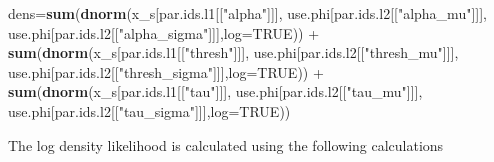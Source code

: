\documentclass[]{article}
\newenvironment{Shaded}{\begin{snugshade}}{\end{snugshade}}
\newcommand{\KeywordTok}[1]{\textcolor[rgb]{0.13,0.29,0.53}{\textbf{{#1}}}}
\newcommand{\DataTypeTok}[1]{\textcolor[rgb]{0.13,0.29,0.53}{{#1}}}
\newcommand{\StringTok}[1]{\textcolor[rgb]{0.31,0.60,0.02}{{#1}}}
\newcommand{\OtherTok}[1]{\textcolor[rgb]{0.56,0.35,0.01}{{#1}}}
\newcommand{\NormalTok}[1]{{#1}}
\begin{document}
\begin{Shaded}
\begin{Highlighting}[]
\NormalTok{dens=}\KeywordTok{sum}\NormalTok{(}\KeywordTok{dnorm}\NormalTok{(x_s[par.ids.l1[[}\StringTok{"alpha"}\NormalTok{]]],}
               \NormalTok{use.phi[par.ids.l2[[}\StringTok{"alpha_mu"}\NormalTok{]]],}
               \NormalTok{use.phi[par.ids.l2[[}\StringTok{"alpha_sigma"}\NormalTok{]]],}\DataTypeTok{log=}\OtherTok{TRUE}\NormalTok{)) +}\StringTok{ }
\StringTok{    }\KeywordTok{sum}\NormalTok{(}\KeywordTok{dnorm}\NormalTok{(x_s[par.ids.l1[[}\StringTok{"thresh"}\NormalTok{]]],}
              \NormalTok{use.phi[par.ids.l2[[}\StringTok{"thresh_mu"}\NormalTok{]]],}
              \NormalTok{use.phi[par.ids.l2[[}\StringTok{"thresh_sigma"}\NormalTok{]]],}\DataTypeTok{log=}\OtherTok{TRUE}\NormalTok{)) +}
\StringTok{    }\KeywordTok{sum}\NormalTok{(}\KeywordTok{dnorm}\NormalTok{(x_s[par.ids.l1[[}\StringTok{"tau"}\NormalTok{]]],}
              \NormalTok{use.phi[par.ids.l2[[}\StringTok{"tau_mu"}\NormalTok{]]],}
              \NormalTok{use.phi[par.ids.l2[[}\StringTok{"tau_sigma"}\NormalTok{]]],}\DataTypeTok{log=}\OtherTok{TRUE}\NormalTok{)) }
\end{Highlighting}
\end{Shaded}

The log density likelihood is calculated using the following
calculations
\end{document}
